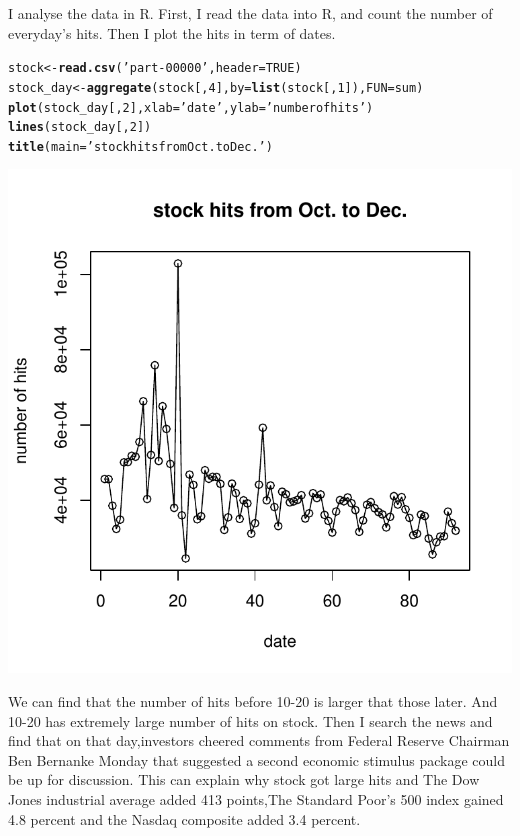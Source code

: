 \documentclass{article}\usepackage[]{graphicx}\usepackage[]{color}
\makeatletter
\def\maxwidth{ %
  \ifdim\Gin@nat@width>\linewidth
    \linewidth
  \else
    \Gin@nat@width
  \fi
}
\newcommand{\hlnum}[1]{\textcolor[rgb]{0.686,0.059,0.569}{#1}}%
\newcommand{\hlstr}[1]{\textcolor[rgb]{0.192,0.494,0.8}{#1}}%
\newcommand{\hlstd}[1]{\textcolor[rgb]{0.345,0.345,0.345}{#1}}%
\newcommand{\hlkwb}[1]{\textcolor[rgb]{0.69,0.353,0.396}{#1}}%
\newcommand{\hlkwc}[1]{\textcolor[rgb]{0.333,0.667,0.333}{#1}}%
\newcommand{\hlkwd}[1]{\textcolor[rgb]{0.737,0.353,0.396}{\textbf{#1}}}%
\newenvironment{kframe}{%
 \def\at@end@of@kframe{}%
 \ifinner\ifhmode%
  \def\at@end@of@kframe{\end{minipage}}%
  \begin{minipage}{\columnwidth}%
 \fi\fi%
 \def\FrameCommand##1{\hskip\@totalleftmargin \hskip-\fboxsep
 \colorbox{shadecolor}{##1}\hskip-\fboxsep
     \hskip-\linewidth \hskip-\@totalleftmargin \hskip\columnwidth}%
 \MakeFramed {\advance\hsize-\width
   \@totalleftmargin\z@ \linewidth\hsize
   \@setminipage}}%
 {\par\unskip\endMakeFramed%
 \at@end@of@kframe}
\newenvironment{knitrout}{}{} %
\makeatother
\begin{document}
I analyse the data in R. First, I read the data into R, and count the number of everyday's hits. Then I plot the hits in term of dates.
\begin{knitrout}
\color{fgcolor}\begin{kframe}
\begin{alltt}
\hlstd{stock}\hlkwb{<-}\hlkwd{read.csv}\hlstd{(}\hlstr{'part-00000'}\hlstd{,}\hlkwc{header}\hlstd{=}\hlnum{TRUE}\hlstd{)}
\hlstd{stock_day}\hlkwb{<-}\hlkwd{aggregate}\hlstd{(stock[,}\hlnum{4}\hlstd{],}\hlkwc{by}\hlstd{=}\hlkwd{list}\hlstd{(stock[,}\hlnum{1}\hlstd{]),}\hlkwc{FUN}\hlstd{=sum)}
\hlkwd{plot}\hlstd{(stock_day[,}\hlnum{2}\hlstd{],}\hlkwc{xlab}\hlstd{=}\hlstr{'date'}\hlstd{,}\hlkwc{ylab}\hlstd{=}\hlstr{'number of hits'}\hlstd{)}
\hlkwd{lines}\hlstd{(stock_day[,}\hlnum{2}\hlstd{])}
\hlkwd{title}\hlstd{(}\hlkwc{main}\hlstd{=}\hlstr{'stock hits from Oct. to Dec.'}\hlstd{)}
\end{alltt}
\end{kframe}
\includegraphics[width=\maxwidth]{figure/r-chunk3-1} 

\end{knitrout}

We can find that the number of hits before 10-20 is larger that those later. And 10-20 has extremely large number of hits on stock. Then I search the news and find that on that day,investors cheered comments from Federal Reserve Chairman Ben Bernanke Monday that suggested a second economic stimulus package could be up for discussion. This can explain why stock got large hits and The Dow Jones industrial average added 413 points,The Standard Poor's 500 index gained 4.8 percent and the Nasdaq composite added 3.4 percent.
\end{document}
